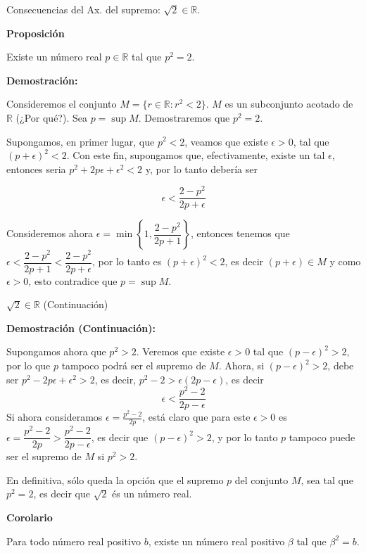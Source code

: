 \documentclass[
  ignorenonframetext,
]{beamer}
\begin{document}
\begin{frame}{Consecuencias del Ax. del supremo:
\(\sqrt{2} \in \mathbb{R}\).}
\protect\hypertarget{consecuencias-del-ax.-del-supremo-sqrt2-in-mathbbr.}{}

\textbf{Proposición}

Existe un número real \(p \in \mathbb{R}\) tal que \(p^2 = 2\).

\textbf{Demostración:}

Consideremos el conjunto \(M = \{r \in \mathbb{R}: r^2 <2 \}\). \(M\) es
un subconjunto acotado de \(\mathbb{R}\) (¿Por qué?). Sea
\(p = \sup M\). Demostraremos que \(p^2 =2\).

Supongamos, en primer lugar, que \(p^2<2\), veamos que existe
\(\epsilon >0\), tal que \((p+ \epsilon)^2 <2\). Con este fin,
supongamos que, efectivamente, existe un tal \(\epsilon\), entonces
seria \(p^2+2p \epsilon +{\epsilon}^2 <2\) y, por lo tanto debería ser

\[
\epsilon < \dfrac{2-p^2}{2p+\epsilon}
\]

Consideremos ahora
\(\epsilon = \min \left\{1,\dfrac{2-p^2}{2p+1} \right\}\), entonces
tenemos que
\(\epsilon < \dfrac{2-p^2}{2p+1} < \dfrac{2-p^2}{2p+\epsilon}\), por lo
tanto es \((p+\epsilon)^2 < 2\), es decir \((p+\epsilon) \in M\) y como
\(\epsilon >0\), esto contradice que \(p= \sup M\).

\end{frame}

\begin{frame}{\(\sqrt{2} \in \mathbb{R}\) (Continuación)}
\protect\hypertarget{sqrt2-in-mathbbr-continuaciuxf3n}{}

\textbf{Demostración (Continuación):}

Supongamos ahora que \(p^2>2\). Veremos que existe \(\epsilon >0\) tal
que \((p-\epsilon)^2 >2\), por lo que \(p\) tampoco podrá ser el supremo
de \(M\). Ahora, si \((p-\epsilon)^2 >2\), debe ser
\(p^2-2p\epsilon+\epsilon^2>2\), es decir,
\(p^2-2 > \epsilon(2p -\epsilon)\), es decir \[
\epsilon < \dfrac{p^2-2}{2p-\epsilon}
\] Si ahora consideramos \(\epsilon = \frac{p^2 -2}{2p}\), está claro
que para este \(\epsilon >0\) es
\(\epsilon = \dfrac{p^2 -2}{2p}> \dfrac{p^2-2}{2p-\epsilon}\), es decir
que \((p-\epsilon)^2 >2\), y por lo tanto \(p\) tampoco puede ser el
supremo de \(M\) si \(p^2 >2\).

En definitiva, sólo queda la opción que el supremo \(p\) del conjunto
\(M\), sea tal que \(p^2=2\), es decir que \(\sqrt{2}\) és un número
real.

\textbf{Corolario}

Para todo número real positivo \(b\), existe un número real positivo
\(\beta\) tal que \(\beta^2 =b\).

\end{frame}
\end{document}
